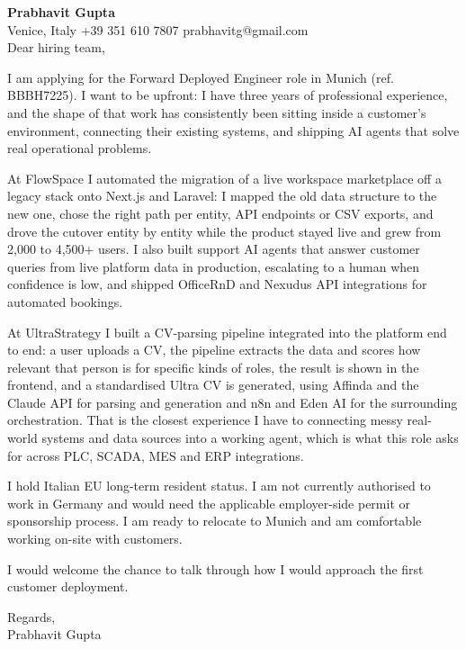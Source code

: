 \documentclass[a4paper,10.5pt]{article}
\begin{document}
\textbf{Prabhavit Gupta}\\
Venice, Italy \textbar{} +39 351 610 7807 \textbar{} prabhavitg@gmail.com\\[10pt]
Dear hiring team,

I am applying for the Forward Deployed Engineer role in Munich (ref. BBBH7225). I want to be upfront: I have three years of professional experience, and the shape of that work has consistently been sitting inside a customer's environment, connecting their existing systems, and shipping AI agents that solve real operational problems.

At FlowSpace I automated the migration of a live workspace marketplace off a legacy stack onto Next.js and Laravel: I mapped the old data structure to the new one, chose the right path per entity, API endpoints or CSV exports, and drove the cutover entity by entity while the product stayed live and grew from 2,000 to 4,500+ users. I also built support AI agents that answer customer queries from live platform data in production, escalating to a human when confidence is low, and shipped OfficeRnD and Nexudus API integrations for automated bookings.

At UltraStrategy I built a CV-parsing pipeline integrated into the platform end to end: a user uploads a CV, the pipeline extracts the data and scores how relevant that person is for specific kinds of roles, the result is shown in the frontend, and a standardised Ultra CV is generated, using Affinda and the Claude API for parsing and generation and n8n and Eden AI for the surrounding orchestration. That is the closest experience I have to connecting messy real-world systems and data sources into a working agent, which is what this role asks for across PLC, SCADA, MES and ERP integrations.

I hold Italian EU long-term resident status. I am not currently authorised to work in Germany and would need the applicable employer-side permit or sponsorship process. I am ready to relocate to Munich and am comfortable working on-site with customers.

I would welcome the chance to talk through how I would approach the first customer deployment.

Regards,\\
Prabhavit Gupta
\end{document}
